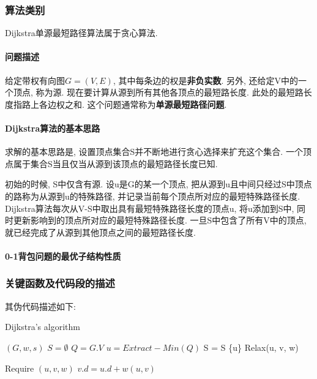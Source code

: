 \subsubsection{算法类别}
Dijkstra单源最短路径算法属于贪心算法.

\paragraph{问题描述}
给定带权有向图$G=(V,E)$, 其中每条边的权是\textbf{非负实数}. 另外, 还给定V中的一个顶点,
称为源. 现在要计算从源到所有其他各顶点的最短路长度.
此处的最短路长度指路上各边权之和. 这个问题通常称为\textbf{单源最短路径问题}.

\paragraph{Dijkstra算法的基本思路}
求解的基本思路是, 设置顶点集合S并不断地进行贪心选择来扩充这个集合.
一个顶点属于集合S当且仅当从源到该顶点的最短路径长度已知.\par

初始的时候, S中仅含有源. 设u是G的某一个顶点,
把从源到u且中间只经过S中顶点的路称为从源到u的特殊路径,
并记录当前每个顶点所对应的最短特殊路径长度.
Dijkstra算法每次从V-S中取出具有最短特殊路径长度的顶点u, 将u添加到S中,
同时更新影响到的顶点所对应的最短特殊路径长度. 一旦S中包含了所有V中的顶点,
就已经完成了从源到其他顶点之间的最短路径长度.

\paragraph{0-1背包问题的最优子结构性质}


\subsubsection{关键函数及代码段的描述}
其伪代码描述如下:
\begin{algorithm}
	\caption{Dijkstra's algorithm}\label{alg:dijkstra}
	\begin{algorithmic}{1}
		\Require $(G, w, s)$
		\State $S = \emptyset$
		\State $Q = G.V$
		\State $u = Extract-Min(Q)$
		\State S = S \cup \{u\}
		\State Relax(u, v, w)
		\EndFor
		\EndWhile
	\end{algorithmic}

	\begin{algorithmic}{1}
		Require $(u, v, w)$
		\State $v.d = u.d + w(u, v)$
		\EndIf
	\end{algorithmic}
\end{algorithm}

